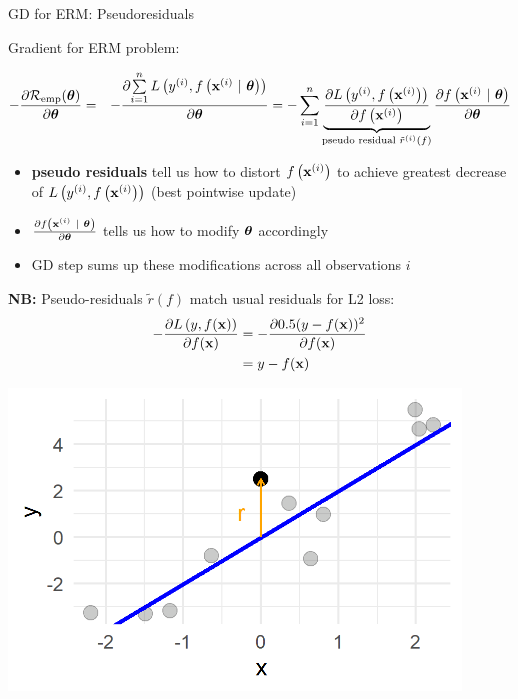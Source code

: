 \documentclass[11pt,compress,t,notes=noshow, xcolor=table]{beamer}
\begin{document}
\begin{vbframe}{GD for ERM: Pseudoresiduals}

\begin{footnotesize}

Gradient for ERM problem: 

\vspace*{-0.5cm}

\begin{eqnarray*}
- \frac{\partial{\mathcal{R}_{\text{emp}}(\bm{\theta})}}{\partial \bm{\theta}} &=& - \frac{\partial{\sum\limits_{i=1}^nL\left(y^{(i)}, f\left(\mathbf{x}^{(i)} ~|~ \bm{\theta}\right)\right)}}{\partial \bm{\theta}}= - \sum\limits_{i=1}^n \underbrace{\frac{\partial{L\left(y^{(i)}, f\left(\mathbf{x}^{(i)}\right)\right)}}{\partial f\left(\mathbf{x}^{(i)}\right)}}_{\text{pseudo residual } \tilde r^{(i)}(f)} \frac{\partial{f\left(\mathbf{x}^{(i)} ~|~ \bm{\theta}\right)}}{\partial \bm{\theta}}
\end{eqnarray*}

\vspace*{-0.5cm}

\begin{itemize}
	\item \textbf{pseudo residuals} tell us how to distort $f\left(\mathbf{x}^{(i)}\right)$ to achieve greatest decrease of $L\left(y^{(i)}, f\left(\mathbf{x}^{(i)}\right)\right)$ (best pointwise update)
	\item $\frac{\partial{f\left(\mathbf{x}^{(i)} ~|~ \bm{\theta}\right)}}{\partial \bm{\theta}}$ tells us how to modify $\bm{\theta}$ accordingly
	\item GD step sums up these modifications across all observations $i$
\end{itemize}

\begin{minipage}[b]{0.45\textwidth}
  \textbf{NB:} Pseudo-residuals 
  $\tilde{r}\left( f \right)$ 
  match usual residuals for L2 loss:
  \begin{align*}
  - \frac{\partial{L\left(y, f(\mathbf{x})\right)}}{\partial f(\mathbf{x})} & = - \frac{\partial{0.5(y - f(\mathbf{x}))^2}}{\partial f(\mathbf{x})}\\ 
                   & = y - f(\mathbf{x})
  \end{align*}
\end{minipage}%
\begin{minipage}[b]{0.05\textwidth}
   \phantom{foo}
\end{minipage}
\begin{minipage}[b]{0.45\textwidth}
  \includegraphics[width=0.9\textwidth]{figure_man/pseudo_residual_1.png}
\end{minipage}

\end{footnotesize}


\end{vbframe}


\endlecture
\end{document}
